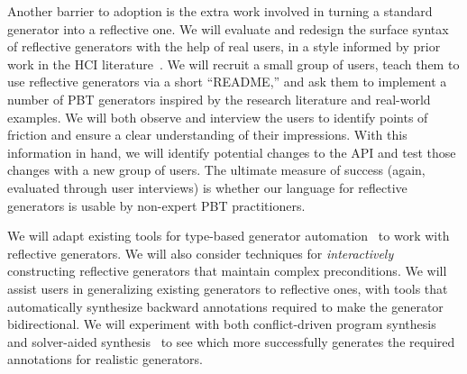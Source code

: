 Another barrier to adoption is the extra work involved in turning a standard
generator into a reflective one. 
We will evaluate and redesign the surface syntax of reflective generators with
the help of real users, in a style informed by prior work in the HCI
literature~\cite{ref:ko2015practical}.  We will recruit a small group of users, teach
them to use reflective generators via a short ``README,'' and ask
them to implement a number of PBT generators inspired by the research
literature and real-world examples. We will both observe and interview
the users to identify points of friction and ensure a clear understanding of their
impressions. With this information in hand, we will identify potential changes
to the API and test those changes with a new group of users.  The
ultimate measure of success (again, evaluated through user interviews)
is whether our language for reflective generators is usable by non-expert PBT
practitioners.


We will adapt existing tools for type-based generator
automation~\cite{mista2019deriving} to work with reflective generators.
We will also consider techniques for {\em interactively}
constructing reflective generators that maintain complex preconditions.
We will assist
users in generalizing existing generators to reflective ones, with tools that automatically synthesize backward annotations
required to make the generator bidirectional. We will experiment with both
conflict-driven program synthesis~\cite{feng_program_2018} and solver-aided
synthesis~\cite{torlak_growing_2013} to see which more successfully generates
the required annotations for realistic generators.

